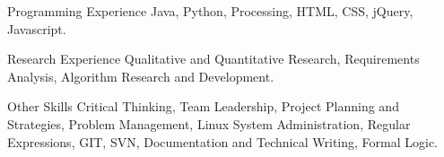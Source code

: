 \begin{cvskills}

  \cvskill
    {Programming Experience} %
    {Java, Python, Processing, HTML, CSS, jQuery, Javascript.} %



  \cvskill
    {Research Experience} %
    {Qualitative and Quantitative Research, Requirements Analysis, Algorithm Research and Development.} %

  \cvskill
    {Other Skills} %
    {Critical Thinking, Team Leadership, Project Planning and Strategies, Problem Management, Linux System Administration, Regular Expressions, GIT, SVN, Documentation and Technical Writing, Formal Logic.} %

\end{cvskills}